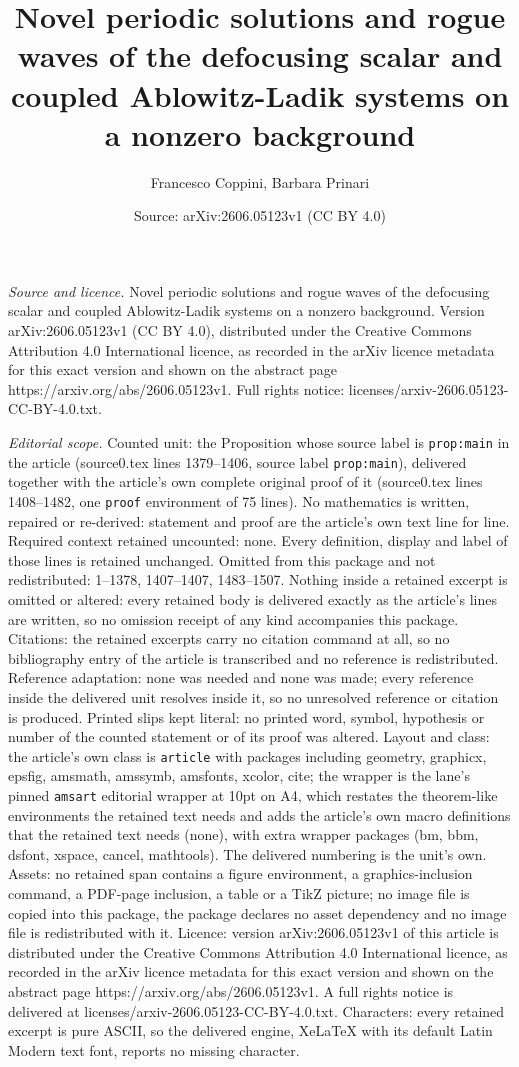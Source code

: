 \documentclass[10pt,a4paper]{amsart}
\title[Novel periodic solutions and rogue waves of the defocusing s]{Novel periodic solutions and rogue waves of the defocusing scalar and coupled Ablowitz-Ladik systems on a nonzero background}
\author{Francesco Coppini, Barbara Prinari}
\date{Source: arXiv:2606.05123v1 (CC BY 4.0)}
\begin{document}
\maketitle

\noindent\emph{Source and licence.} Novel periodic solutions and rogue waves of the defocusing scalar and coupled Ablowitz-Ladik systems on a nonzero background. Version arXiv:2606.05123v1 (CC BY 4.0), distributed under the Creative Commons Attribution 4.0 International licence, as recorded in the arXiv licence metadata for this exact version and shown on the abstract page https://arxiv.org/abs/2606.05123v1. Full rights notice: licenses/arxiv-2606.05123-CC-BY-4.0.txt.\par\smallskip

\noindent\textit{Editorial scope.} Counted unit: the Proposition whose source label is \texttt{prop:main} in the article (source0.tex lines 1379--1406, source label \texttt{prop:main}), delivered together with the article's own complete original proof of it (source0.tex lines 1408--1482, one \texttt{proof} environment of 75 lines). No mathematics is written, repaired or re-derived: statement and proof are the article's own text line for line. Required context retained uncounted: none. Every definition, display and label of those lines is retained unchanged. Omitted from this package and not redistributed: 1--1378, 1407--1407, 1483--1507. Nothing inside a retained excerpt is omitted or altered: every retained body is delivered exactly as the article's lines are written, so no omission receipt of any kind accompanies this package. Citations: the retained excerpts carry no citation command at all, so no bibliography entry of the article is transcribed and no reference is redistributed. Reference adaptation: none was needed and none was made; every reference inside the delivered unit resolves inside it, so no unresolved reference or citation is produced. Printed slips kept literal: no printed word, symbol, hypothesis or number of the counted statement or of its proof was altered. Layout and class: the article's own class is \texttt{article} with packages including geometry, graphicx, epsfig, amsmath, amssymb, amsfonts, xcolor, cite; the wrapper is the lane's pinned \texttt{amsart} editorial wrapper at 10pt on A4, which restates the theorem-like environments the retained text needs and adds the article's own macro definitions that the retained text needs (none), with extra wrapper packages (bm, bbm, dsfont, xspace, cancel, mathtools). The delivered numbering is the unit's own. Assets: no retained span contains a figure environment, a graphics-inclusion command, a PDF-page inclusion, a table or a TikZ picture; no image file is copied into this package, the package declares no asset dependency and no image file is redistributed with it. Licence: version arXiv:2606.05123v1 of this article is distributed under the Creative Commons Attribution 4.0 International licence, as recorded in the arXiv licence metadata for this exact version and shown on the abstract page https://arxiv.org/abs/2606.05123v1. A full rights notice is delivered at licenses/arxiv-2606.05123-CC-BY-4.0.txt. Characters: every retained excerpt is pure ASCII, so the delivered engine, XeLaTeX with its default Latin Modern text font, reports no missing character.
\end{document}
